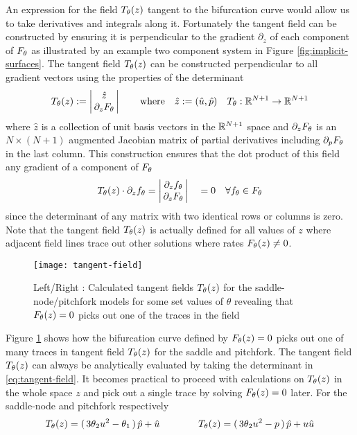 An expression for the field $T_{\theta}(z)$ tangent to the bifurcation curve would allow us to take derivatives and integrals along it. Fortunately the tangent field can be constructed by ensuring it is perpendicular to the gradient $\partial_z$ of each component of $F_{\theta}$ as illustrated by an example two component system in Figure \ref{fig:implicit-surfaces}. The tangent field $T_{\theta}(z)$ can be constructed perpendicular to all gradient vectors using the properties of the determinant \cite{Goldman2005CurvatureSurfaces}
\begin{align}
    T_{\theta}(z):=
    \left|\begin{matrix}
        \hat{z} \\
        \,\partial_{z}F_{\theta}\,
    \end{matrix}\right|
    \qquad\mathrm{where}\quad
    \hat{z}:=(\hat{u},\hat{p})\quad
	T_{\theta} : \mathbb{R}^{N+1}\rightarrow\mathbb{R}^{N+1}
	\label{eq:tangent-field}
\end{align}
where $\hat{z}$ is a collection of unit basis vectors in the $\mathbb{R}^{N+1}$ space and $\partial_{z}F_{\theta}$ is an $N\times(N+1)$ augmented Jacobian matrix of partial derivatives including $\partial_p F_{\theta}$ in the last column. This construction ensures that the dot product of this field any gradient of a component of $F_{\theta}$
\begin{align}
    T_{\theta}(z)\cdot\partial_z f_{\theta} =
    \left|\begin{matrix}
        \partial_z f_{\theta} \\
        \,\partial_{z}F_{\theta}\,
    \end{matrix}\right|
    \quad =0 \quad\forall f_{\theta}\in F_{\theta}
\end{align}
since the determinant of any matrix with two identical rows or columns is zero. Note that the tangent field $T_{\theta}(z)$ is actually defined for all values of $z$ where adjacent field lines trace out other solutions where rates $F_{\theta}(z)\neq0$.

\begin{figure}[H]
\centering{}
\captionsetup{justification=centering}
\texttt{[image: tangent-field]}
\caption{Left/Right : Calculated tangent fields $T_{\theta}(z)$ for the saddle-node/pitchfork models for some set values of $\theta$ revealing that $F_{\theta}(z)=0$ picks out one of the traces in the field}
\label{fig:tangent-field}
\end{figure}

Figure \ref{fig:tangent-field} shows how the bifurcation curve defined by $F_{\theta}(z)=0$ picks out one of many traces in tangent field $T_{\theta}(z)$ for the saddle and pitchfork. The tangent field $T_{\theta}(z)$ can always be analytically evaluated by taking the determinant in \eqref{eq:tangent-field}. It becomes practical to proceed with calculations on $T_{\theta}(z)$ in the whole space $z$ and pick out a single trace by solving $F_{\theta}(z)=0$ later. For the saddle-node and pitchfork respectively
\begin{align}
    T_{\theta}(z)=(\,3\theta_2 u^2-\theta_1\,)\,\hat{p}+\hat{u}
    \qquad\qquad
    T_{\theta}(z)=(\,3\theta_2 u^2-p\,)\,\hat{p}+u\hat{u}
    \label{eq:tangent-field-examples}
\end{align}

